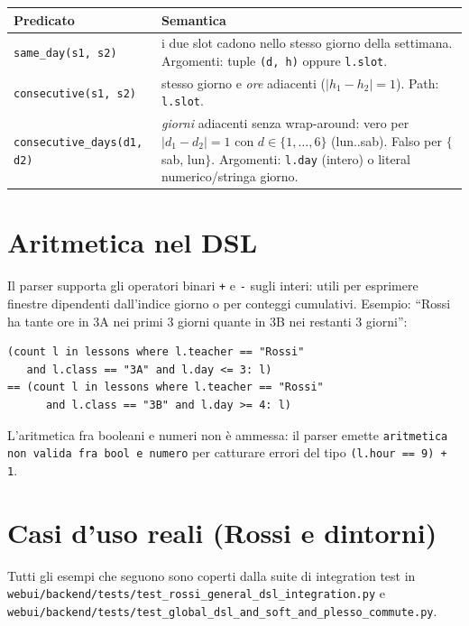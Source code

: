 \begin{tabular}{lp{8cm}}
\toprule
\textbf{Predicato} & \textbf{Semantica} \\
\midrule
\texttt{same\_day(s1, s2)} &
  i due slot cadono nello stesso giorno della settimana.
  Argomenti: tuple \texttt{(d, h)} oppure \texttt{l.slot}. \\

\texttt{consecutive(s1, s2)} &
  stesso giorno e \emph{ore} adiacenti ($|h_1-h_2|=1$). Path:
  \texttt{l.slot}. \\

\texttt{consecutive\_days(d1, d2)} &
  \emph{giorni} adiacenti senza wrap-around: vero per
  $|d_1-d_2|=1$ con $d \in \{1,\ldots,6\}$ (lun..sab). Falso
  per $\{$sab, lun$\}$. Argomenti: \texttt{l.day} (intero) o
  literal numerico/stringa giorno. \\
\bottomrule
\end{tabular}

\section{Aritmetica nel DSL}
\label{sec:dsl-arithmetic}

Il parser supporta gli operatori binari \texttt{+} e \texttt{-}
sugli interi: utili per esprimere finestre dipendenti
dall'indice giorno o per conteggi cumulativi. Esempio: ``Rossi
ha tante ore in 3A nei primi 3 giorni quante in 3B nei restanti
3 giorni'':
\begin{lstlisting}
(count l in lessons where l.teacher == "Rossi"
   and l.class == "3A" and l.day <= 3: l)
== (count l in lessons where l.teacher == "Rossi"
      and l.class == "3B" and l.day >= 4: l)
\end{lstlisting}

L'aritmetica fra booleani e numeri non \`e ammessa: il parser
emette \texttt{aritmetica non valida fra bool e numero} per
catturare errori del tipo \texttt{(l.hour == 9) + 1}.

\section{Casi d'uso reali (Rossi e dintorni)}
\label{sec:dsl-rossi}

Tutti gli esempi che seguono sono coperti dalla suite di
integration test in
\texttt{webui/backend/tests/test\_rossi\_general\_dsl\_integration.py}
e
\texttt{webui/backend/tests/test\_global\_dsl\_and\_soft\_and\_plesso\_commute.py}.


